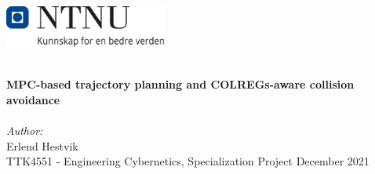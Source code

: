 
\begin{titlepage}
    \vbox{ }
    \vbox{ }
    \begin{center}
    \includegraphics[width=0.40\textwidth]{Images/NTNU_logo.png}\\[1cm]
    \vbox{ }
    
    \HRule \\[0.4cm]
    { \huge \bfseries MPC-based trajectory planning and COLREGs-aware collision avoidance}\\[0.4cm]
    \HRule \\[1.5cm]
    
    \large
    \emph{Author:}\\
    Erlend Hestvik\\
    \vspace{2cm}
    TTK4551 - Engineering Cybernetics, Specialization Project
    \vfill
    {\large December 2021}
    \end{center}
    \afterpage{\blankpage}
    \end{titlepage}
